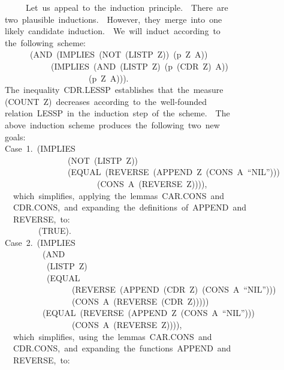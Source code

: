 \documentclass[11pt]{book}
\newenvironment{pubasis}{\begin{flushleft}\ttfamily\small}{\normalsize\rmfamily\end{flushleft}}
\begin{document}
\begin{pubasis}
~~~~~~~Let~us~appeal~to~the~induction~principle.~~There~are\\
~~two~plausible~inductions.~~However,~they~merge~into~one\\
~~likely~candidate~induction.~~We~will~induct~according~to\\
~~the~following~scheme:\\
~~~~~~~~(AND~(IMPLIES~(NOT~(LISTP~Z))~(p~Z~A))\\
~~~~~~~~~~~~~(IMPLIES~(AND~(LISTP~Z)~(p~(CDR~Z)~A))\\
~~~~~~~~~~~~~~~~~~~~~~(p~Z~A))).\\
~~The~inequality~CDR.LESSP~establishes~that~the~measure\\
~~(COUNT~Z)~decreases~according~to~the~well-founded\\
~~relation~LESSP~in~the~induction~step~of~the~scheme.~~The\\
~~above~induction~scheme~produces~the~following~two~new\\
~~goals:\\

~~Case~1.~(IMPLIES\\
~~~~~~~~~~~~~~~~~(NOT~(LISTP~Z))\\
~~~~~~~~~~~~~~~~~(EQUAL~(REVERSE~(APPEND~Z~(CONS~A~``NIL'')))\\
~~~~~~~~~~~~~~~~~~~~~~~~(CONS~A~(REVERSE~Z)))),\\

~~~~which~simplifies,~applying~the~lemmas~CAR.CONS~and\\
~~~~CDR.CONS,~and~expanding~the~definitions~of~APPEND~and\\
~~~~REVERSE,~to:\\

~~~~~~~~~~(TRUE).\\

~~Case~2.~(IMPLIES\\
~~~~~~~~~~~(AND\\
~~~~~~~~~~~~(LISTP~Z)\\
~~~~~~~~~~~~(EQUAL\\
~~~~~~~~~~~~~~~~~~(REVERSE~(APPEND~(CDR~Z)~(CONS~A~``NIL'')))\\
~~~~~~~~~~~~~~~~~~(CONS~A~(REVERSE~(CDR~Z)))))\\
~~~~~~~~~~~(EQUAL~(REVERSE~(APPEND~Z~(CONS~A~``NIL'')))\\
~~~~~~~~~~~~~~~~~~(CONS~A~(REVERSE~Z)))),\\

~~~~which~simplifies,~using~the~lemmas~CAR.CONS~and\\
~~~~CDR.CONS,~and~expanding~the~functions~APPEND~and\\
~~~~REVERSE,~to:\\


\end{pubasis}
\end{document}

